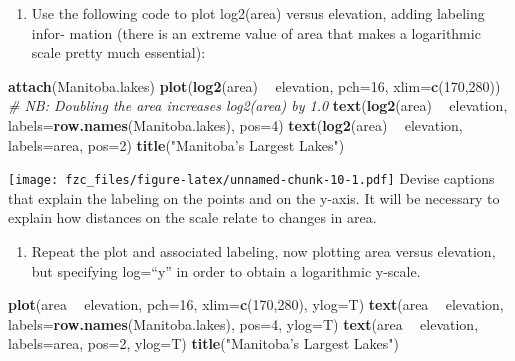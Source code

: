 \documentclass[
]{article}
\newenvironment{Shaded}{\begin{snugshade}}{\end{snugshade}}
\newcommand{\CommentTok}[1]{\textcolor[rgb]{0.56,0.35,0.01}{\textit{#1}}}
\newcommand{\DataTypeTok}[1]{\textcolor[rgb]{0.13,0.29,0.53}{#1}}
\newcommand{\DecValTok}[1]{\textcolor[rgb]{0.00,0.00,0.81}{#1}}
\newcommand{\KeywordTok}[1]{\textcolor[rgb]{0.13,0.29,0.53}{\textbf{#1}}}
\newcommand{\NormalTok}[1]{#1}
\newcommand{\OperatorTok}[1]{\textcolor[rgb]{0.81,0.36,0.00}{\textbf{#1}}}
\newcommand{\StringTok}[1]{\textcolor[rgb]{0.31,0.60,0.02}{#1}}
\providecommand{\tightlist}{%
  \setlength{\itemsep}{0pt}\setlength{\parskip}{0pt}}
\begin{document}
\begin{enumerate}
\def\labelenumi{(\alph{enumi})}
\tightlist
\item
  Use the following code to plot log2(area) versus elevation, adding
  labeling infor- mation (there is an extreme value of area that makes a
  logarithmic scale pretty much essential):
\end{enumerate}

\begin{Shaded}
\begin{Highlighting}[]
\KeywordTok{attach}\NormalTok{(Manitoba.lakes)}
\KeywordTok{plot}\NormalTok{(}\KeywordTok{log2}\NormalTok{(area) }\OperatorTok{~}\StringTok{ }\NormalTok{elevation, }\DataTypeTok{pch=}\DecValTok{16}\NormalTok{, }\DataTypeTok{xlim=}\KeywordTok{c}\NormalTok{(}\DecValTok{170}\NormalTok{,}\DecValTok{280}\NormalTok{))}
\CommentTok{# NB: Doubling the area increases log2(area) by 1.0}
\KeywordTok{text}\NormalTok{(}\KeywordTok{log2}\NormalTok{(area) }\OperatorTok{~}\StringTok{ }\NormalTok{elevation, }\DataTypeTok{labels=}\KeywordTok{row.names}\NormalTok{(Manitoba.lakes), }\DataTypeTok{pos=}\DecValTok{4}\NormalTok{)}
\KeywordTok{text}\NormalTok{(}\KeywordTok{log2}\NormalTok{(area) }\OperatorTok{~}\StringTok{ }\NormalTok{elevation, }\DataTypeTok{labels=}\NormalTok{area, }\DataTypeTok{pos=}\DecValTok{2}\NormalTok{) }
\KeywordTok{title}\NormalTok{(}\StringTok{"Manitoba’s Largest Lakes"}\NormalTok{)}
\end{Highlighting}
\end{Shaded}

\texttt{[image: fzc\_files/figure-latex/unnamed-chunk-10-1.pdf]} Devise
captions that explain the labeling on the points and on the y-axis. It
will be necessary to explain how distances on the scale relate to
changes in area.

\begin{enumerate}
\def\labelenumi{(\alph{enumi})}
\setcounter{enumi}{1}
\tightlist
\item
  Repeat the plot and associated labeling, now plotting area versus
  elevation, but specifying log=``y'' in order to obtain a logarithmic
  y-scale.
\end{enumerate}

\begin{Shaded}
\begin{Highlighting}[]
\KeywordTok{plot}\NormalTok{(area }\OperatorTok{~}\StringTok{ }\NormalTok{elevation, }\DataTypeTok{pch=}\DecValTok{16}\NormalTok{, }\DataTypeTok{xlim=}\KeywordTok{c}\NormalTok{(}\DecValTok{170}\NormalTok{,}\DecValTok{280}\NormalTok{), }\DataTypeTok{ylog=}\NormalTok{T)}
\KeywordTok{text}\NormalTok{(area }\OperatorTok{~}\StringTok{ }\NormalTok{elevation, }\DataTypeTok{labels=}\KeywordTok{row.names}\NormalTok{(Manitoba.lakes), }\DataTypeTok{pos=}\DecValTok{4}\NormalTok{, }\DataTypeTok{ylog=}\NormalTok{T)}
\KeywordTok{text}\NormalTok{(area }\OperatorTok{~}\StringTok{ }\NormalTok{elevation, }\DataTypeTok{labels=}\NormalTok{area, }\DataTypeTok{pos=}\DecValTok{2}\NormalTok{, }\DataTypeTok{ylog=}\NormalTok{T) }
\KeywordTok{title}\NormalTok{(}\StringTok{"Manitoba’s Largest Lakes"}\NormalTok{)}
\end{Highlighting}
\end{Shaded}
\end{document}
